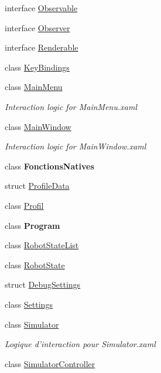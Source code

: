 \begin{DoxyCompactItemize}
interface \hyperlink{interface_interface_graphique_1_1_observable}{Observable}
\item 
interface \hyperlink{interface_interface_graphique_1_1_observer}{Observer}
\item 
interface \hyperlink{interface_interface_graphique_1_1_renderable}{Renderable}
\item 
class \hyperlink{class_interface_graphique_1_1_key_bindings}{Key\-Bindings}
\item 
class \hyperlink{class_interface_graphique_1_1_main_menu}{Main\-Menu}
\begin{DoxyCompactList}\small\item\em Interaction logic for Main\-Menu.\-xaml \end{DoxyCompactList}\item 
class \hyperlink{class_interface_graphique_1_1_main_window}{Main\-Window}
\begin{DoxyCompactList}\small\item\em Interaction logic for Main\-Window.\-xaml \end{DoxyCompactList}\item 
class {\bfseries Fonctions\-Natives}
\item 
struct \hyperlink{struct_interface_graphique_1_1_profile_data}{Profile\-Data}
\item 
class \hyperlink{class_interface_graphique_1_1_profil}{Profil}
\item 
class {\bfseries Program}
\item 
class \hyperlink{class_interface_graphique_1_1_robot_state_list}{Robot\-State\-List}
\item 
class \hyperlink{class_interface_graphique_1_1_robot_state}{Robot\-State}
\item 
struct \hyperlink{struct_interface_graphique_1_1_debug_settings}{Debug\-Settings}
\item 
class \hyperlink{class_interface_graphique_1_1_settings}{Settings}
\item 
class \hyperlink{class_interface_graphique_1_1_simulator}{Simulator}
\begin{DoxyCompactList}\small\item\em Logique d'interaction pour Simulator.\-xaml \end{DoxyCompactList}\item 
class \hyperlink{class_interface_graphique_1_1_simulator_controller}{Simulator\-Controller}
\end{DoxyCompactItemize}
